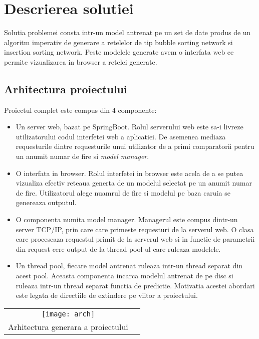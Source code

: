\documentclass[12pt]{article}
\begin{document}
\section{Descrierea solutiei}
Solutia problemei consta intr-un model antrenat pe un set de date produs de un algoritm imperativ de generare a retelelor de tip bubble sorting network si insertion sorting network. Peste modelele generate avem o interfata web ce permite vizualizarea in browser a retelei generate.

\subsection{Arhitectura proiectului}

Proiectul complet este compus din 4 componente:
\begin{itemize}
	\item Un server web, bazat pe SpringBoot. Rolul serverului web este sa-i livreze utilizatorului codul interfetei web a aplicatiei. De asemenea mediaza requesturile dintre requesturile unui utilizator de a primi comparatorii pentru un anumit numar de fire si \textit{model manager}. 
	\item O interfata in browser. Rolul interfetei in browser este acela de a se putea vizualiza efectiv reteaua generta de un modelul selectat pe un anumit numar de fire. Utilizatorul alege nuamrul de fire si modelul pe baza caruia se genereaza outputul.
	\item O componenta numita model manager. Managerul este compus dintr-un server TCP/IP, prin care care primeste requesturi de la serverul web. O clasa care proceseaza requestul primit de la serverul web si in functie de parametrii din request cere output de la thread pool-ul care ruleaza modelele.
	\item Un thread pool, fiecare model antrenat ruleaza intr-un thread separat din acest pool. Aceasta componenta incarca modelul antrenat de pe disc si ruleaza intr-un thread separat functia de predictie. Motivatia acestei abordari este legata de directiile de extindere pe viitor a proiectului.
\end{itemize}


\begin{center}
\begin{tabular}{cc}
\texttt{[image: arch]} \\
Arhitectura generara a proiectului
\end{tabular}
\end{center}
\end{document}
